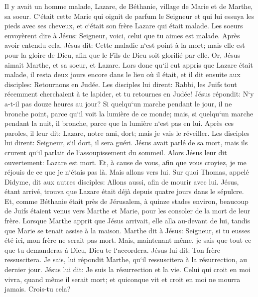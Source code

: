 \verse Il y avait un homme malade, Lazare, de Béthanie, village de Marie et de Marthe, sa soeur. 
\verse C`était cette Marie qui oignit de parfum le Seigneur et qui lui essuya les pieds avec ses cheveux, et c`était son frère Lazare qui était malade. 
\verse Les soeurs envoyèrent dire à Jésus: Seigneur, voici, celui que tu aimes est malade. 
\verse Après avoir entendu cela, Jésus dit: Cette maladie n`est point à la mort; mais elle est pour la gloire de Dieu, afin que le Fils de Dieu soit glorifié par elle. 
\verse Or, Jésus aimait Marthe, et sa soeur, et Lazare. 
\verse Lors donc qu`il eut appris que Lazare était malade, il resta deux jours encore dans le lieu où il était, 
\verse et il dit ensuite aux disciples: Retournons en Judée. 
\verse Les disciples lui dirent: Rabbi, les Juifs tout récemment cherchaient à te lapider, et tu retournes en Judée! 
\verse Jésus répondit: N`y a-t-il pas douze heures au jour? Si quelqu`un marche pendant le jour, il ne bronche point, parce qu`il voit la lumière de ce monde; 
\verse mais, si quelqu`un marche pendant la nuit, il bronche, parce que la lumière n`est pas en lui. 
\verse Après ces paroles, il leur dit: Lazare, notre ami, dort; mais je vais le réveiller. 
\verse Les disciples lui dirent: Seigneur, s`il dort, il sera guéri. 
\verse Jésus avait parlé de sa mort, mais ils crurent qu`il parlait de l`assoupissement du sommeil. 
\verse Alors Jésus leur dit ouvertement: Lazare est mort. 
\verse Et, à cause de vous, afin que vous croyiez, je me réjouis de ce que je n`étais pas là. Mais allons vers lui. 
\verse Sur quoi Thomas, appelé Didyme, dit aux autres disciples: Allons aussi, afin de mourir avec lui. 
\verse Jésus, étant arrivé, trouva que Lazare était déjà depuis quatre jours dans le sépulcre. 
\verse Et, comme Béthanie était près de Jérusalem, à quinze stades environ, 
\verse beaucoup de Juifs étaient venus vers Marthe et Marie, pour les consoler de la mort de leur frère. 
\verse Lorsque Marthe apprit que Jésus arrivait, elle alla au-devant de lui, tandis que Marie se tenait assise à la maison. 
\verse Marthe dit à Jésus: Seigneur, si tu eusses été ici, mon frère ne serait pas mort. 
\verse Mais, maintenant même, je sais que tout ce que tu demanderas à Dieu, Dieu te l`accordera. 
\verse Jésus lui dit: Ton frère ressuscitera. 
\verse Je sais, lui répondit Marthe, qu`il ressuscitera à la résurrection, au dernier jour. 
\verse Jésus lui dit: Je suis la résurrection et la vie. Celui qui croit en moi vivra, quand même il serait mort; 
\verse et quiconque vit et croit en moi ne mourra jamais. Crois-tu cela? 
